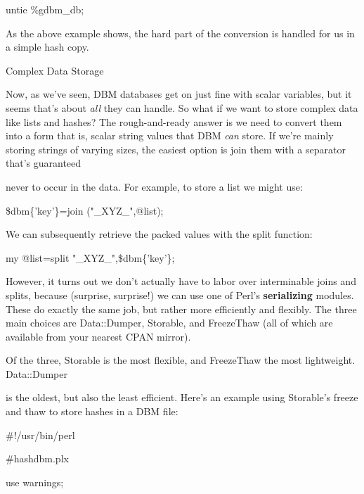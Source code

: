 \documentclass[a4paper,11pt]{book}
\begin{document}
\noindent untie \%gdbm\_db;

\noindent 

\noindent As the above example shows, the hard part of the conversion is handled for us in a simple hash copy.

\noindent 

\noindent Complex Data Storage

\noindent 

\noindent Now, as we've seen, DBM databases get on just fine with scalar variables, but it seems that's about \textit{all }they can handle. So what if we want to store complex data like lists and hashes? The rough-and-ready answer is we need to convert them into a form that is, scalar string values that DBM \textit{can }store. If we're mainly storing strings of varying sizes, the easiest option is join them with a separator that's guaranteed

\noindent never to occur in the data. For example, to store a list we might use:

\noindent 

\noindent \$dbm\{'key'\}=join ("\_XYZ\_",@list);

\noindent 

\noindent We can subsequently retrieve the packed values with the split function:

\noindent 

\noindent my @list=split "\_XYZ\_",\$dbm\{'key'\};

\noindent 

\noindent However, it turns out we don't actually have to labor over interminable joins and splits, because (surprise, surprise!) we can use one of Perl's \textbf{serializing }modules. These do exactly the same job, but rather more efficiently and flexibly. The three main choices are Data::Dumper, Storable, and FreezeThaw (all of which are available from your nearest CPAN mirror).

\noindent 

\noindent Of the three, Storable is the most flexible, and FreezeThaw the most lightweight. Data::Dumper

\noindent is the oldest, but also the least efficient. Here's an example using Storable's freeze and thaw to store hashes in a DBM file:

\noindent 

\noindent \#!/usr/bin/perl

\noindent \#hashdbm.plx

\noindent use warnings;
\end{document}
